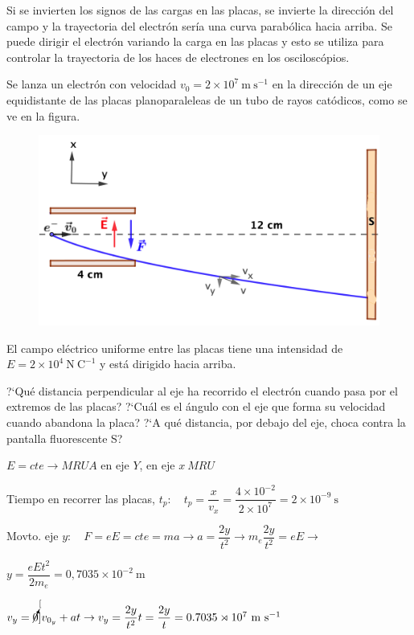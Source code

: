Si se invierten los signos de las cargas en las placas, se invierte la dirección del campo y la trayectoria del electrón sería una curva parabólica hacia arriba. Se puede dirigir el electrón variando la carga en las placas y esto se utiliza para controlar la trayectoria de los haces de electrones en los osciloscópios.

\begin{prob}
Se lanza un electrón con velocidad $v_0=2\times 10^7	 \ \mathrm{m\ s}^{-1}$ en la dirección de un eje equidistante de las placas planoparaleleas de un tubo de rayos catódicos, como se ve en la figura.

\begin{figure}[H]
	\centering
	\includegraphics[width=.8\textwidth]{imagenes/imagenes22/T22IM17.png}
\end{figure}

El campo eléctrico uniforme entre las placas tiene una intensidad de $E = 2\times 10^{4} \ \mathrm{N \ C}^{-1}$ y está dirigido hacia arriba.

 ?`Qué distancia perpendicular al eje ha recorrido el electrón cuando pasa por el extremos de las placas?
 ?`Cuál es el ángulo con el eje que forma su velocidad cuando abandona la placa?
?`A qué distancia, por debajo del eje, choca contra la pantalla fluorescente S?

\end{prob}

$E=cte \to MRUA$ en eje $Y$, en eje $x \ MRU$

Tiempo en recorrer las placas, $t_p: \quad t_p=\dfrac x {v_x}=\dfrac{4\times 10^{-2}}{2\times 10^7}=2\times 10^{-9} \ \mathrm{s}$

Movto. eje $y:\quad F=eE=cte=ma \to a=\dfrac{2y}{t^2} \to m_e\dfrac{2y}{t^2}=eE \to$

$ y=\dfrac{eEt^2}{2m_e}=0,7035\times 10^{-2} \ \mathrm{m}$

$v_y=\cancelto[0]{v_{0_y}}+at \to v_y=\dfrac{2y}{t^2}t=\dfrac{2y}{t}=0.7035\rtimes 10^{7}\ \mathrm{m\ s}^{-1}$

